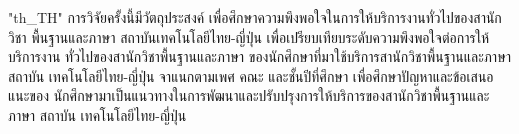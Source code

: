 \XeTeXlinebreaklocale "th_TH"	
\textthai{การวิจัยครั้งนี้มีวัตถุประสงค์  เพื่อศึกษาความพึงพอใจในการให้บริการงานทั่วไปของสานักวิชา พื้นฐานและภาษา สถาบันเทคโนโลยีไทย-ญี่ปุ่น  เพื่อเปรียบเทียบระดับความพึงพอใจต่อการให้บริการงาน ทั่วไปของสานักวิชาพื้นฐานและภาษา ของนักศึกษาที่มาใช้บริการสานักวิชาพื้นฐานและภาษา สถาบัน เทคโนโลยีไทย-ญี่ปุ่น จาแนกตามเพศ คณะ และชั้นปีที่ศึกษา  เพื่อศึกษาปัญหาและข้อเสนอแนะของ นักศึกษามาเป็นแนวทางในการพัฒนาและปรับปรุงการให้บริการของสานักวิชาพื้นฐานและภาษา สถาบัน เทคโนโลยีไทย-ญี่ปุ่น}